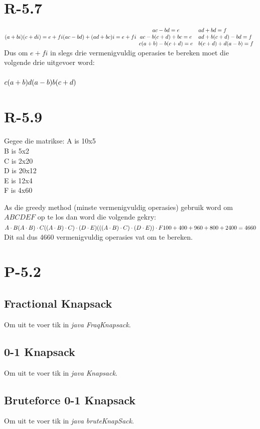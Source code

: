 \documentclass[a4paper,11pt,titlepage]{article}
\begin{document}
\section{R-5.7}
\begin{math}
(a + bi)(c + di) = e + fi\\
(ac - bd) + (ad+bc)i = e + fi\\
\\
\begin{array}{clrr}
ac - bd = e & ad + bd = f\\
ac - b(c+d) + bc = e & ad + b(c+d) - bd = f\\
c(a+b) - b(c+d) = e & b(c+d) + d(a-b) = f
\end{array}
\end{math}
\\

Dus om $e + fi$ in slegs drie vermenigvuldig operasies te bereken moet die volgende drie uitgevoer word:\\
\\
\begin{math}
c(a+b)\\
d(a-b)\\
b(c+d)
\end{math}
\section{R-5.9}
Gegee die matrikse:
A is 10x5\\
B is 5x2\\
C is 2x20\\
D is 20x12\\
E is 12x4\\
F is 4x60

As die greedy method (minste vermenigvuldig operasies) gebruik word om $ABCDEF$ op te los dan word die volgende gekry:
\\
\begin{math}
A \cdot B\\
(A \cdot B)\cdot C\\
((A \cdot B)\cdot C)\cdot (D \cdot E)\\
(((A \cdot B)\cdot C)\cdot (D \cdot E)) \cdot F\\
100 + 400 + 960 + 800 + 2400 = 4660\\
\end{math}
\\
Dit sal dus 4660 vermenigvuldig operasies vat om te bereken.

\section{P-5.2}

\subsection{Fractional Knapsack}
Om uit te voer tik in \emph{java FraqKnapsack}.
\subsection{0-1 Knapsack}
Om uit te voer tik in \emph{java Knapsack}.
\subsection{Bruteforce 0-1 Knapsack}
Om uit te voer tik in \emph{java bruteKnapSack}.
\end{document}

